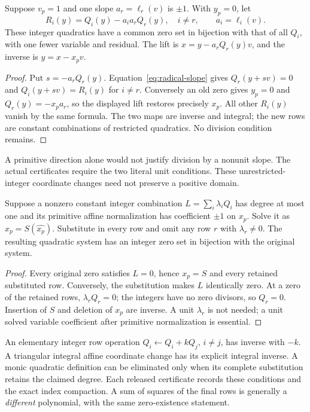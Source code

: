 \begin{theorem}\label{thm:radical-projection}
Suppose $v_p=1$ and one slope $a_r=\ell_r(v)$ is $\pm1$.
With $y_p=0$, let
\[
 R_i(y)=Q_i(y)-a_ia_rQ_r(y),\quad i\ne r,
 \qquad a_i=\ell_i(v).
\]
These integer quadratics have a common zero set in bijection with that
of all $Q_i$, with one fewer variable and residual. The lift is
$x=y-a_rQ_r(y)v$, and the inverse is $y=x-x_pv$.
\end{theorem}
\begin{proof}
Put $s=-a_rQ_r(y)$. Equation~\eqref{eq:radical-slope} gives
$Q_r(y+sv)=0$ and $Q_i(y+sv)=R_i(y)$ for $i\ne r$.
Conversely an old zero gives $y_p=0$ and
$Q_r(y)=-x_pa_r$, so the displayed lift restores precisely $x_p$.
All other $R_i(y)$ vanish by the same formula. The two maps are inverse
and integral; the new rows are constant combinations of restricted
quadratics. No division condition remains.
\end{proof}
A primitive direction alone would not justify division by a nonunit
slope. The actual certificates require the two literal unit conditions.
These unrestricted-integer coordinate changes need not preserve a
positive domain.

\begin{lemma}\label{lem:affine-elimination}
Suppose a nonzero constant integer combination $L=\sum_i\lambda_iQ_i$
has degree at most one and its primitive affine normalization has
coefficient $\pm1$ on $x_p$. Solve it as $x_p=S(\widehat{x_p})$.
Substitute in every row and omit any row $r$ with $\lambda_r\ne0$.
The resulting quadratic system has an integer zero set in bijection
with the original system.
\end{lemma}
\begin{proof}
Every original zero satisfies $L=0$, hence $x_p=S$ and every retained
substituted row. Conversely, the substitution makes $L$ identically
zero. At a zero of the retained rows, $\lambda_rQ_r=0$; the integers
have no zero divisors, so $Q_r=0$. Insertion of $S$ and deletion of
$x_p$ are inverse. A unit $\lambda_r$ is not needed; a unit solved
variable coefficient after primitive normalization is essential.
\end{proof}

An elementary integer row operation $Q_i\leftarrow Q_i+kQ_j$,
$i\ne j$, has inverse with $-k$. A triangular integral affine coordinate
change has its explicit integral inverse. A monic quadratic definition
can be eliminated only when its complete substitution retains the claimed
degree. Each released certificate records these conditions and the exact
index compaction. A sum of squares of the final rows is generally a
\emph{different} polynomial, with the same zero-existence statement.

